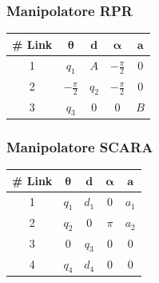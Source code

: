 \documentclass[11pt, a4paper]{report}
\begin{document}
\begin{minipage}[t]{0.48\textwidth}
    \subsubsection*{Manipolatore RPR}
    \centering
    \begin{tabular}{|c|c|c|c|c|}
        \hline
        \textbf{\# Link} & \(\boldsymbol{\theta}\) & \(\boldsymbol{d}\) & \(\boldsymbol{\alpha}\) & \(\boldsymbol{a}\) \\
        \hline
        1 & \(q_{1}\) & \(A\) & \(-\frac{\pi}{2}\) & 0\\
        \hline
        2 & \(-\frac{\pi}{2}\) & \(q_{2}\) & \(-\frac{\pi}{2}\) & 0\\
        \hline
        3 & \(q_{3}\) & 0 & 0 & \(B\)\\
        \hline
    \end{tabular}
\end{minipage}
\hfill
\begin{minipage}[t]{0.48\textwidth}
    \subsubsection*{Manipolatore SCARA}
    \centering
    \begin{tabular}{|c|c|c|c|c|}
        \hline
        \textbf{\# Link} & \(\boldsymbol{\theta}\) & \(\boldsymbol{d}\) & \(\boldsymbol{\alpha}\) & \(\boldsymbol{a}\) \\
        \hline
        1 & \(q_{1}\) & \(d_{1}\) & 0 & \(a_{1}\) \\
        \hline
        2 & \(q_{2}\) & 0 & \(\pi\) & \(a_{2}\) \\
        \hline
        3 & 0 & \(q_{3}\) & 0 & 0 \\
        \hline
        4 & \(q_{4}\) & \(d_{4}\) & 0 & 0 \\
        \hline
    \end{tabular}

\end{minipage}

\vspace{1cm} %
\end{document}
